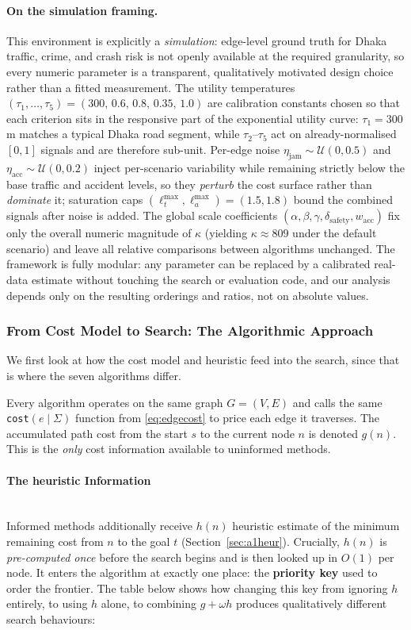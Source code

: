 \documentclass{ai-lab-report}
\begin{document}
\paragraph{On the simulation framing.} This environment is explicitly a \emph{simulation}: edge-level ground truth for Dhaka traffic, crime, and crash risk is not openly available at the required granularity, so every numeric parameter is a transparent, qualitatively motivated design choice rather than a fitted measurement. The utility temperatures $(\tau_1,\dots,\tau_5)=(300,\,0.6,\,0.8,\,0.35,\,1.0)$ are calibration constants chosen so that each criterion sits in the responsive part of the exponential utility curve: $\tau_1=300$\,m matches a typical Dhaka road segment, while $\tau_2$--$\tau_5$ act on already-normalised $[0,1]$ signals and are therefore sub-unit. Per-edge noise $\eta_{\mathrm{jam}}\sim\mathcal{U}(0,0.5)$ and $\eta_{\mathrm{acc}}\sim\mathcal{U}(0,0.2)$ inject per-scenario variability while remaining strictly below the base traffic and accident levels, so they \emph{perturb} the cost surface rather than \emph{dominate} it; saturation caps $(\ell^{\max}_t,\ell^{\max}_a)=(1.5,1.8)$ bound the combined signals after noise is added. The global scale coefficients $(\alpha,\beta,\gamma,\delta_{\mathrm{safety}},w_{\mathrm{acc}})$ fix only the overall numeric magnitude of $\kappa$ (yielding $\kappa\approx809$ under the default scenario) and leave all relative comparisons between algorithms unchanged. The framework is fully modular: any parameter can be replaced by a calibrated real-data estimate without touching the search or evaluation code, and our analysis depends only on the resulting orderings and ratios, not on absolute values.


\subsubsection{From Cost Model to Search: The Algorithmic Approach}

We first look at how the cost model and heuristic feed into the search, since that is where the seven algorithms differ.

Every algorithm operates on the same graph $G=(V,E)$ and calls the same \texttt{cost}$(e\mid\Sigma)$ function from \cref{eq:edgecost} to price each edge it traverses. The accumulated path cost from the start $s$ to the current node $n$ is denoted $g(n)$. This is the \emph{only} cost information available to uninformed methods.

\paragraph{The heuristic Information}
\mbox{}\\
Informed methods additionally receive $h(n)$ heuristic estimate of the minimum remaining cost 
from $n$ to the goal $t$ (Section~\ref{sec:a1heur}). Crucially, $h(n)$ is \emph{pre-computed once} before the search begins 
and is then looked up in $O(1)$ per node. It enters the algorithm at exactly one place: the \textbf{priority key} used to order the frontier. 
The table below shows how changing this key from ignoring $h$ entirely, to using $h$ alone, to combining $g+\omega h$ produces qualitatively different search behaviours:
\end{document}
